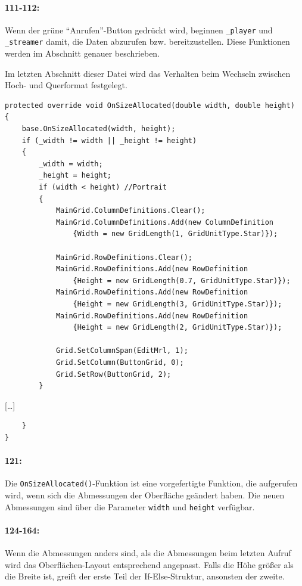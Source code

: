 \paragraph{111-112:} Wenn der grüne \enquote{Anrufen}-Button gedrückt wird, beginnen \texttt{\_player} und \texttt{\_streamer} damit, die Daten abzurufen bzw. bereitzustellen. Diese Funktionen werden im Abschnitt  genauer beschrieben.

Im letzten Abschnitt dieser Datei wird das Verhalten beim Wechseln zwischen Hoch- und Querformat festgelegt.
\begin{verbatim}
protected override void OnSizeAllocated(double width, double height)
{
    base.OnSizeAllocated(width, height);
    if (_width != width || _height != height)
    {
        _width = width;
        _height = height;
        if (width < height) //Portrait
        {
            MainGrid.ColumnDefinitions.Clear();
            MainGrid.ColumnDefinitions.Add(new ColumnDefinition
                {Width = new GridLength(1, GridUnitType.Star)});

            MainGrid.RowDefinitions.Clear();
            MainGrid.RowDefinitions.Add(new RowDefinition
                {Height = new GridLength(0.7, GridUnitType.Star)});
            MainGrid.RowDefinitions.Add(new RowDefinition
                {Height = new GridLength(3, GridUnitType.Star)});
            MainGrid.RowDefinitions.Add(new RowDefinition
                {Height = new GridLength(2, GridUnitType.Star)});

            Grid.SetColumnSpan(EditMrl, 1);
            Grid.SetColumn(ButtonGrid, 0);
            Grid.SetRow(ButtonGrid, 2);
        }
\end{verbatim}
[\dots]
\begin{verbatim}
    }
}
\end{verbatim}
\paragraph{121:} Die \texttt{OnSizeAllocated()}-Funktion ist eine vorgefertigte Funktion, die aufgerufen wird, wenn sich die Abmessungen der Oberfläche geändert haben.
Die neuen Abmessungen sind über die Parameter \texttt{width} und \texttt{height} verfügbar.
\paragraph{124-164:} Wenn die Abmessungen anders sind, als die Abmessungen beim letzten Aufruf wird das Oberflächen-Layout entsprechend angepasst.
Falls die Höhe größer als die Breite ist, greift der erste Teil der If-Else-Struktur, ansonsten der zweite.
